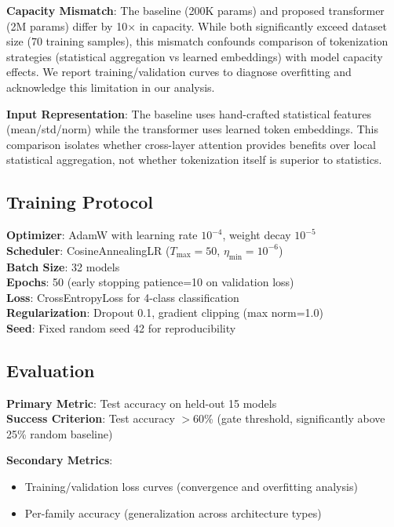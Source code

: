 \textbf{Capacity Mismatch}: The baseline (200K params) and proposed transformer (2M params) differ by 10$\times$ in capacity. While both significantly exceed dataset size (70 training samples), this mismatch confounds comparison of tokenization strategies (statistical aggregation vs learned embeddings) with model capacity effects. We report training/validation curves to diagnose overfitting and acknowledge this limitation in our analysis.

\textbf{Input Representation}: The baseline uses hand-crafted statistical features (mean/std/norm) while the transformer uses learned token embeddings. This comparison isolates whether cross-layer attention provides benefits over local statistical aggregation, not whether tokenization itself is superior to statistics.

\subsection{Training Protocol}

\textbf{Optimizer}: AdamW with learning rate $10^{-4}$, weight decay $10^{-5}$\\
\textbf{Scheduler}: CosineAnnealingLR ($T_{\text{max}}=50$, $\eta_{\text{min}}=10^{-6}$)\\
\textbf{Batch Size}: 32 models\\
\textbf{Epochs}: 50 (early stopping patience=10 on validation loss)\\
\textbf{Loss}: CrossEntropyLoss for 4-class classification\\
\textbf{Regularization}: Dropout 0.1, gradient clipping (max norm=1.0)\\
\textbf{Seed}: Fixed random seed 42 for reproducibility

\subsection{Evaluation}

\textbf{Primary Metric}: Test accuracy on held-out 15 models\\
\textbf{Success Criterion}: Test accuracy $>$60\% (gate threshold, significantly above 25\% random baseline)

\textbf{Secondary Metrics}:
\begin{itemize}
\item Training/validation loss curves (convergence and overfitting analysis)
\item Per-family accuracy (generalization across architecture types)
\end{itemize}

